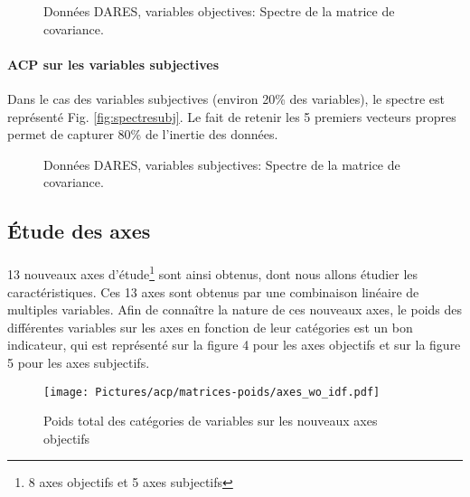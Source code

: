 \documentclass[11pt,fleqn,a4paper,openany,frenchb]{book} %
\begin{document}
\begin{figure}[!h]
    \centering
  \hspace{2pt}
  \caption{Données DARES, variables objectives: Spectre de la matrice de covariance.}
\end{figure}
  

\paragraph{ACP sur les variables subjectives\\}
Dans le cas des variables subjectives (environ 20\% des variables), le spectre est représenté Fig. \ref{fig:spectresubj}. Le fait de retenir les 5 premiers vecteurs propres permet de capturer 80\% de l'inertie des données.

\begin{figure}[!h]
    \centering
  \hspace{2pt}
  \caption{Données DARES, variables subjectives: Spectre de la matrice de covariance.}
\end{figure}

\subsection{\'Etude des axes }
\paragraph{}
13 nouveaux axes d'étude\footnote{8 axes objectifs et 5 axes subjectifs} sont ainsi obtenus, dont nous allons étudier les caractéristiques. Ces 13 axes sont obtenus par une combinaison linéaire de multiples variables. Afin de connaître la nature de ces nouveaux axes, le poids des différentes variables sur les axes en fonction de leur catégories est un bon indicateur, qui est représenté sur la figure 4 pour les axes objectifs et sur la figure 5 pour les axes subjectifs. 
\begin{figure}[!h]
    \centering
  \texttt{[image: Pictures/acp/matrices-poids/axes\_wo\_idf.pdf]}
    \caption{Poids total des catégories de variables sur les nouveaux axes objectifs}
    \label{fig:ACPobj}
\end{figure}
\end{document}
